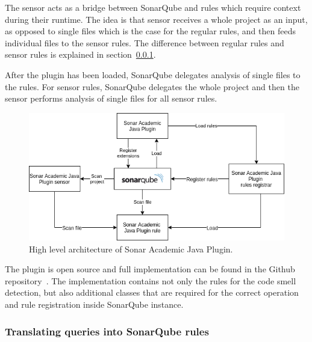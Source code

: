 The sensor acts as a bridge between SonarQube and rules which require context during their runtime.
The idea is that sensor receives a whole project as an input, as opposed to single files which is the case for the
regular rules, and then feeds individual files to the sensor rules.
The difference between regular rules and sensor rules is explained in section~\ref{subsubsec:translating-queries}.

After the plugin has been loaded, SonarQube delegates analysis of single files to the rules.
For sensor rules, SonarQube delegates the whole project and then the sensor performs analysis of single
files for all sensor rules.

\begin{figure}[ht]
    \begin{center}
        \includegraphics[scale=0.7]{figures/architecture_diagram.png}
        \caption{High level architecture of Sonar Academic Java Plugin.}
        \label{architecture_diagram}
    \end{center}
\end{figure}

The plugin is open source and full implementation can be found in the Github repository~\cite{sonar_plugin}.
The implementation contains not only the rules for the code smell detection, but also additional classes
that are required for the correct operation and rule registration inside SonarQube instance.

\FloatBarrier

\subsubsection{Translating queries into SonarQube rules}\label{subsubsec:translating-queries}


